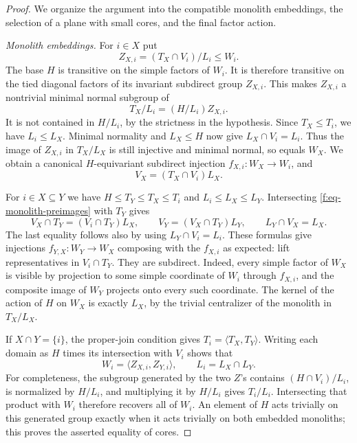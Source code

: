 \begin{proof}
We organize the argument into the compatible monolith embeddings, the
selection of a plane with small cores, and the final factor action.

\emph{Monolith embeddings.}
For $i\in X$ put
\begin{equation}\label{f:eq-zxi}
 Z_{X,i}=(T_X\cap V_i)/L_i\le W_i.
\end{equation}
The base $H$ is transitive on the simple factors of $W_i$. It is therefore
transitive on the tied diagonal factors of its invariant subdirect group
$Z_{X,i}$. This makes $Z_{X,i}$ a nontrivial minimal normal subgroup of
\[
 T_X/L_i=(H/L_i)Z_{X,i}.
\]
It is not contained in $H/L_i$, by the strictness in the hypothesis.
Since $T_X\le T_i$, we have $L_i\le L_X$. Minimal normality and
$L_X\le H$ now give $L_X\cap V_i=L_i$. Thus the image of $Z_{X,i}$ in
$T_X/L_X$ is still injective and minimal normal, so equals $W_X$.
We obtain a canonical $H$-equivariant subdirect injection
$f_{X,i}:W_X\to W_i$, and
\begin{equation}\label{f:eq-monolith-preimages}
 V_X=(T_X\cap V_i)L_X.
\end{equation}

For $i\in X\subseteq Y$ we have
$H\le T_Y\le T_X\le T_i$ and $L_i\le L_X\le L_Y$.
Intersecting \eqref{f:eq-monolith-preimages} with $T_Y$ gives
\[
 V_X\cap T_Y=(V_i\cap T_Y)L_X,\qquad
 V_Y=(V_X\cap T_Y)L_Y,\qquad
 L_Y\cap V_X=L_X.
\]
The last equality follows also by using $L_Y\cap V_i=L_i$.
These formulas give injections $f_{Y,X}:W_Y\to W_X$ composing with the
$f_{X,i}$ as expected: lift representatives in $V_i\cap T_Y$.
They are subdirect. Indeed, every simple factor of $W_X$ is visible by
projection to some simple coordinate of $W_i$ through $f_{X,i}$, and the
composite image of $W_Y$ projects onto every such coordinate. The kernel
of the action of $H$ on $W_X$ is exactly $L_X$, by the trivial centralizer
of the monolith in $T_X/L_X$.

If $X\cap Y=\{i\}$, the proper-join condition gives
$T_i=\langle T_X,T_Y\rangle$. Writing each domain as $H$ times its
intersection with $V_i$ shows that
\begin{equation}\label{f:eq-core-intersection}
 W_i=\langle Z_{X,i},Z_{Y,i}\rangle,
 \qquad L_i=L_X\cap L_Y.
\end{equation}
For completeness, the subgroup generated by the two $Z$'s contains
$(H\cap V_i)/L_i$, is normalized by $H/L_i$, and multiplying it by $H/L_i$
gives $T_i/L_i$. Intersecting that product with $W_i$ therefore recovers
all of $W_i$. An element of $H$ acts trivially on this generated group
exactly when it acts trivially on both embedded monoliths; this proves
the asserted equality of cores.


\end{proof}
